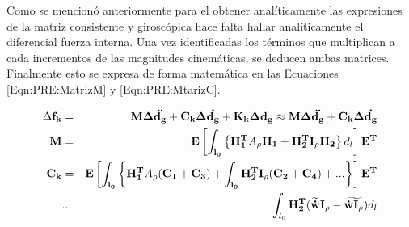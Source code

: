 Como se mencionó anteriormente para el obtener analíticamente las expresiones de la matriz consistente y giroscópica hace falta hallar analíticamente el diferencial fuerza interna. Una vez identificadas los términos que multiplican a cada incrementos de las magnitudes cinemáticas, se deducen ambas matrices. Finalmente esto se expresa de forma matemática en las Ecuaciones \eqref{Eqn:PRE:MatrizM} y \eqref{Eqn:PRE:MtarizC}.

\begin{eqnarray}
	\Delta \bf{f_k}&= &\bf{M} \Delta \ddot{\bf{d}_g}+\bf{C}_k \Delta \dot{\bf{d}_g}+\bf{K}_k \Delta \bf{d}_g\approx \bf{M} \Delta \ddot{\bf{d}_g}+\bf{C}_k \Delta \dot{\bf{d}_g}\\
	\label{Eqn:PRE:MatrizM}
	\bf{M}&=&\bf{E}\left [ \int _{l_0} \left \{ \bf{H}_1^T \text{$A_\rho$}\bf{H}_1 +\bf{H}_2^T\bf{I}_\rho\bf{H_2} \right \} \text{$d_l$} \right  ]\bf{E}^T\\
	\label{Eqn:PRE:MtarizC}
	\bf{C}_k&=&\bf{E}\left [ \int _{l_0} \left \{ \bf{H}_1^T \text{$A_\rho$}(\bf{C}_1+\bf{C}_3) +\int _{l_0}\bf{H}_2^T\bf{I}_\rho(\bf{C}_2+\bf{C}_4) +...\right \}\right  ]\bf{E}^T\\
	&...& \int_{l_0} \bf{H}_2 ^T(\widetilde{\dot{w}}\bf{I}_\rho-\widetilde{\dot{w}\bf{I}_\rho}) \text{$d_l$} 	
\end{eqnarray}

\newpage  
